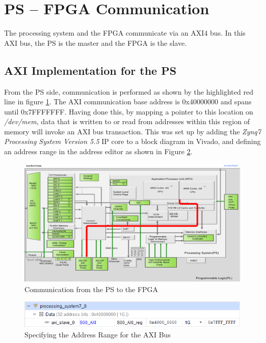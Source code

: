 \section{PS -- FPGA Communication}\label{az-com}

The processing system and the FPGA communicate via an AXI4 bus. In this AXI bus, the PS is the master and the FPGA is the slave. 

\subsection{AXI Implementation for the PS}
From the PS side, communication is performed as shown by the highlighted red line in figure \ref{ps-con}. The AXI communication base address is 0x40000000 and spans until 0x7FFFFFFF. Having done this, by mapping a pointer to this location on \textit{/dev/mem}, data that is written to or read from addresses within this region of memory will invoke an AXI bus transaction. This was set up by adding the \textit{Zynq7 Processing System Version 5.5} IP core to a block diagram in Vivado, and defining an address range in the address editor as shown in Figure \ref{addr-editor}. 

\begin{figure}
	\centering 
	\includegraphics[width=\textwidth]{figures/ps-pl-conn}
	\caption{Communication from the PS to the FPGA}\label{ps-con}
\end{figure}

\begin{figure}
	\centering 
	\includegraphics[width=\textwidth]{figures/address_editor}
	\caption{Specifying the Address Range for the AXI Bus}\label{addr-editor}
\end{figure}

